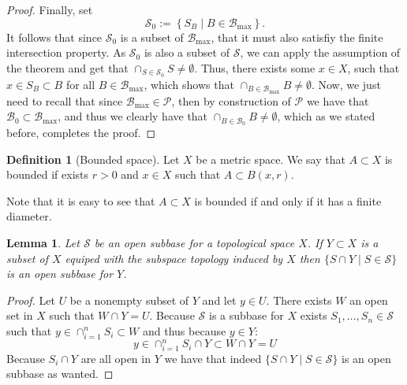 \documentclass[11pt,a4paper]{article}
\theoremstyle{definition}
\newtheorem{definition}{Definition}[section]
\theoremstyle{plain}
\newtheorem{lemma}[theorem]{Lemma}
\newcommand{\set}[2]{ \left\{ #1 \mid #2 \right\} }
\begin{document}
\begin{proof}
    Finally, set
    \[
      \mathcal S_0 := \set{S_B}{B \in \mathcal B_{\max}}.
    \]
    It follows that since $\mathcal S_0$ is a subset of $\mathcal B_{\max}$, 
    that it must also satisfiy the finite intersection property.
    As $\mathcal S_0$ is also a subset of $\mathcal S$,
    we can apply the assumption of the theorem and get that
    $\cap_{S \in \mathcal S_0} S \neq \emptyset$.
    Thus, there exists some $x \in X$, such that $x \in S_B \subset B$
    for all $B \in \mathcal B_{\max}$, which shows that
    $\cap_{B \in \mathcal B_{\max}} B \neq \emptyset$.
    Now, we just need to recall that since $\mathcal B_{\max} \in \mathcal P$,
    then by construction of $\mathcal P$ we have that 
    $\mathcal B_0 \subset \mathcal B_{\max}$, and thus we clearly have that
    $\cap_{B \in \mathcal B_0} B \neq \emptyset$, which as we stated before,
    completes the proof.
  \end{proof}
  
  \begin{definition}[Bounded space]
    Let $X$ be a metric space. We say that $A \subset X$ is 
    bounded if exists $r > 0$ and $x \in X$ such that $A \subset B(x,r)$.
  \end{definition}

  Note that it is easy to see that $A \subset X$ is bounded if and only
  if it has a finite diameter.
  
  \begin{lemma}
    Let $\mathcal{S}$ be an open subbase for a topological space $X$.
    If $Y \subset X$ is a subset of $X$ equiped with the subspace
    topology induced by $X$ then $\{S \cap Y \mid S \in \mathcal{S}\}$
    is an open subbase for $Y$.
  \end{lemma}
  \begin{proof}
    Let $U$ be a nonempty subset of $Y$ and let $y \in U$. There
    exists $W$ an open set in $X$ such that $W \cap Y = U$. Because
    $\mathcal{S}$ is a subbase for $X$ exists 
    $S_1,\dots,S_n \in \mathcal{S}$ such that 
    $y \in \cap_{i=1}^{n}{S_i} \subset W$ and thus because $y \in Y$:
    \[
      y \in \cap_{i=1}^{n}{S_i \cap Y} \subset W \cap Y = U
    \]
    Because $S_i \cap Y$ are all open in $Y$ we have that indeed
    $\{S \cap Y \mid S \in \mathcal{S}\}$ is an open subbase as wanted.
  \end{proof}
\end{document}
